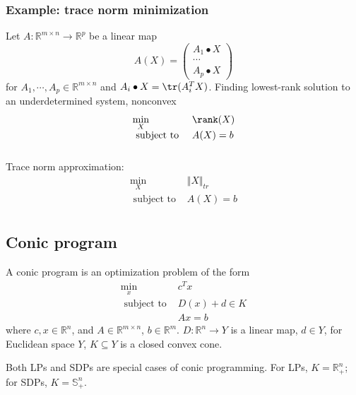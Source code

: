 \documentclass[a4paper]{article}
\begin{document}
{\subsubsection{Example: trace norm minimization}
Let $A: \mathbb{R}^{m \times n} \rightarrow \mathbb{R}^p$ be a linear map
\begin{equation}
  A(X)=\left(\begin{array}{c}
    A_{1} \bullet X \\
    \cdots \\ \nonumber
    A_{p} \bullet X
    \end{array}\right)
\end{equation}
for $A_1, \cdots, A_p \in \mathbb{R}^{m \times n}$ and $A_i \bullet X = \tr(A^T_i X)$. Finding lowest-rank solution to an underdetermined system, nonconvex
\begin{equation}
  \begin{array}{ll}
     \min\limits_{X} & \rank(X) \\
    \text { subject to } & A(X) = b\\ \nonumber
\end{array} 
\end{equation}
Trace norm approximation:
\begin{equation}
  \begin{array}{ll}
     \min\limits_{X} & \Vert X \Vert_{tr} \\
    \text { subject to } & A(X) = b\\ \nonumber
\end{array} 
\end{equation}

\subsection{Conic program}
\begin{defi}
  A conic program is an optimization problem of the form
  \[
  \begin{array}{ll}
      \min\limits_{x} & c^T x \\
      \text { subject to } & D(x) + d \in K \\ \nonumber
      & Ax = b
  \end{array} 
  \]
  where $c, x \in \mathbb{R}^n$, and $A\in \mathbb{R}^{m \times n}$, $b \in \mathbb{R}^m$. $D: \mathbb{R}^n \rightarrow Y$ is a linear map, $d \in Y$, for Euclidean space $Y$, $K \subseteq Y$ is a closed convex cone.
\end{defi}
Both LPs and SDPs are special cases of conic programming. For LPs, $K = \mathbb{R}^n_+$; for SDPs, $K = \mathbb{S}^n_+$.

}
\end{document}
